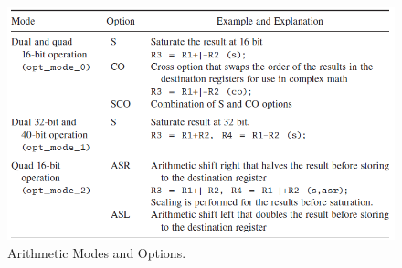 \begin{figure} [H]
	\centering
	\includegraphics[width=\linewidth]{graphics/5.png}
	\caption{Arithmetic Modes and Options.}
	\label{fig:5}
\end{figure}

